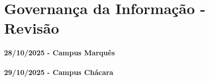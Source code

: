 \documentclass[
]{book}
\begin{document}
\chapter{Governança da Informação - Revisão}\label{governanuxe7a-da-informauxe7uxe3o---revisuxe3o}

\subsubsection*{28/10/2025 - Campus Marquês}\label{campus-marquuxeas-11}

\subsubsection*{29/10/2025 - Campus Chácara}\label{campus-chuxe1cara-11}

  
\end{document}
